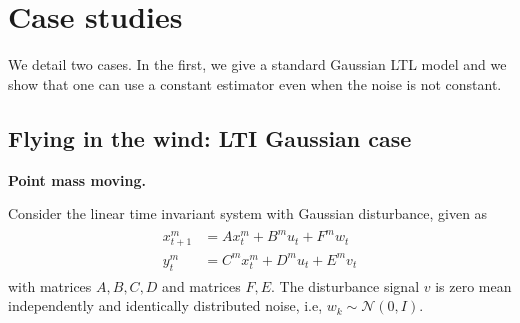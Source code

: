 \documentclass{ifacconf}
\begin{document}
%
%
%
%
%
%  
%
%
%





\section{Case studies}
 We detail two cases. In the first, we give a standard Gaussian LTL model and we show that one can use a constant estimator even when the noise is not constant.
 
\subsection{Flying in the wind: LTI Gaussian case}



\noindent\textbf{Point mass moving.}
    
Consider the linear time invariant system with Gaussian disturbance, given as 
\begin{align}\begin{aligned}
	x^m_{t+1} &= A x^m_{t}+B^mu_{t}+ F^m w_{t}\\
	y^m_{t}&=C^m x^m_{t}+D^m u_{t}+E^m v_{t}\end{aligned}
\end{align}
with matrices $A,B,C,D$ and matrices $F,E$. 
The disturbance signal $v$ is zero mean independently and identically  distributed noise, i.e, $w_k\sim \mathcal{N}(0,I)$.
\end{document}

